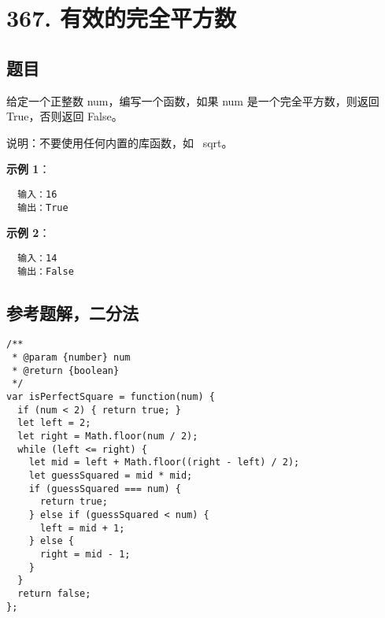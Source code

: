 \newpage
\section{367. 有效的完全平方数}
\label{leetcode:367}

\subsection{题目}

给定一个正整数 num，编写一个函数，如果 num 是一个完全平方数，则返回 True，否则返回 False。

说明：不要使用任何内置的库函数，如  sqrt。

\textbf{示例 1}：

\begin{verbatim}
  输入：16
  输出：True
\end{verbatim}

\textbf{示例 2}：

\begin{verbatim}
  输入：14
  输出：False
\end{verbatim}

\subsection{参考题解，二分法}

\begin{verbatim}
/**
 * @param {number} num
 * @return {boolean}
 */
var isPerfectSquare = function(num) {
  if (num < 2) { return true; }
  let left = 2;
  let right = Math.floor(num / 2);
  while (left <= right) {
    let mid = left + Math.floor((right - left) / 2);
    let guessSquared = mid * mid;
    if (guessSquared === num) {
      return true;
    } else if (guessSquared < num) {
      left = mid + 1;
    } else {
      right = mid - 1;
    }
  }
  return false;
};
\end{verbatim}
